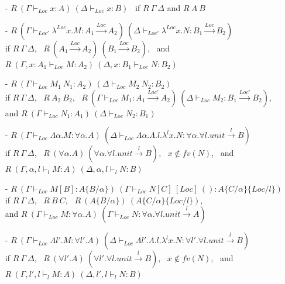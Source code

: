 \documentclass[a4paper]{article}
\theoremstyle{plain}
\theoremstyle{definition}
\newcommand{\lamL}[3]{\lambda^{#1}#2.#3}
\newcommand{\subst}[2]{\{#1/#2\}}
\newcommand{\funL}[1]{\xrightarrow{#1}}
\newcommand{\typing}[4]{#1\vdash_{#2} #3 : #4}
\newcommand{\Loc}{Loc}
\newcommand{\logicalRelText}{R}
\newcommand{\logicalRel}[2]{\logicalRelText \ #1 \ #2}
\newcommand{\logicalRelJudg}[2]{\logicalRelText \ (#1) \ (#2)}
\begin{document}
\begin{itemize}
\item[-]
$\logicalRelJudg
 {\typing{\Gamma}{\Loc}{x}{A}}
 {\typing{\Delta}{\Loc}{x}{B}}$
\ 
if $\logicalRel{\Gamma}{\Delta}$ and $\logicalRel{A}{B}$

\item[-]
$\logicalRelJudg
 {\typing{\Gamma}{\Loc'}{\lamL{\Loc}{x}{M}}{A_1\funL{\Loc}A_2}}
 {\typing{\Delta}{\Loc'}{\lamL{\Loc}{x}{N}}{B_1\funL{\Loc}B_2}}$ \\
if 
$\logicalRel{\Gamma}{\Delta}$, \ 
$\logicalRel{(A_1\funL{\Loc}A_2)}{(B_1\funL{\Loc}B_2)}$, \ and 
$\logicalRelJudg
 {\typing{\Gamma,x:A_1}{\Loc}{M}{A_2}}
 {\typing{\Delta,x:B_1}{\Loc}{N}{B_2}}$

\item[-]
$\logicalRelJudg
 {\typing{\Gamma}{\Loc}{M_1 \ N_1}{A_2}}
 {\typing{\Delta}{\Loc}{M_2 \ N_2}{B_2}}$ \\
if 
$\logicalRel{\Gamma}{\Delta}$, \ 
$\logicalRel{A_2}{B_2}$, \ 
$\logicalRelJudg
 {\typing{\Gamma}{\Loc}{M_1}{A_1\funL{\Loc'}A_2}}
 {\typing{\Delta}{\Loc}{M_2}{B_1\funL{\Loc'}B_2}}$, \\ and
$\logicalRelJudg
 {\typing{\Gamma}{\Loc}{N_1}{A_1}}
 {\typing{\Delta}{\Loc}{N_2}{B_1}}$

\item[-]
$\logicalRelJudg
 {\typing{\Gamma}{\Loc}{\Lambda\alpha.M}{\forall\alpha.A}}
 {\typing{\Delta}{\Loc}{\Lambda\alpha.\Lambda.l.\lamL{l}{x}{N}}{\forall\alpha.\forall l.unit\funL{l}B}}$ \\
if 
$\logicalRel{\Gamma}{\Delta}$, \
$\logicalRel{(\forall\alpha.A)}{(\forall\alpha.\forall l.unit\funL{l}B)}$, \
$x \not\in fv(N)$, \ and \ 
$\logicalRelJudg
 {\typing{\Gamma,\alpha,l}{l}{M}{A}}
 {\typing{\Delta,\alpha,l}{l}{N}{B}}$

\item[-]
$\logicalRelJudg
  {\typing{\Gamma}{\Loc}{M[B]}{A\subst{B}{\alpha}}}
  {\typing{\Gamma}{\Loc}{N[C] \ [\Loc] \ ()}{A\subst{C}{\alpha}\subst{\Loc}{l}}}$ \\  %
if
$\logicalRel{\Gamma}{\Delta}$, \
$\logicalRel{B}{C}$, \
$\logicalRel{(A\subst{B}{\alpha})}{(A\subst{C}{\alpha}\subst{\Loc}{l})}$, \\
and $\logicalRelJudg
  {\typing{\Gamma}{\Loc}{M}{\forall\alpha.A}}
  {\typing{\Gamma}{\Loc}{N}{\forall\alpha.\forall l.unit\funL{l}A}}$

\item[-]
$\logicalRelJudg
 {\typing{\Gamma}{\Loc}{\Lambda l'.M}{\forall l'.A}}
 {\typing{\Delta}{\Loc}{\Lambda l'.\Lambda.l.\lamL{l}{x}{N}}{\forall l'.\forall l.unit\funL{l}B}}$ \\
if 
$\logicalRel{\Gamma}{\Delta}$, \
$\logicalRel{(\forall l'.A)}{(\forall l'.\forall l.unit\funL{l}B)}$, \
$x \not\in fv(N)$, \ and \ 
$\logicalRelJudg
 {\typing{\Gamma,l',l}{l}{M}{A}}
 {\typing{\Delta,l',l}{l}{N}{B}}$


\end{itemize}
\end{document}
